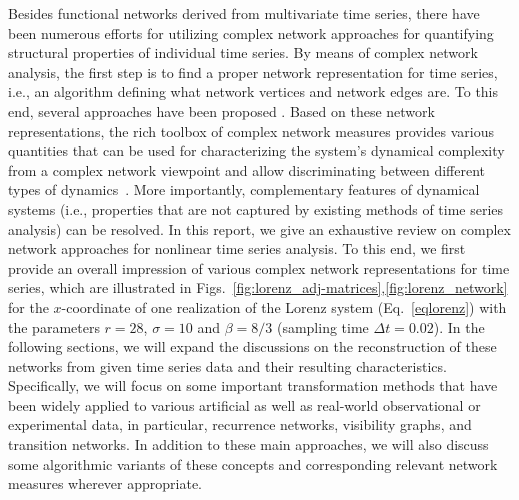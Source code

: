 	Besides functional networks derived from multivariate time series, there have been numerous efforts for utilizing complex network approaches for quantifying structural properties of individual time series. By means of complex network analysis, the first step is to find a proper network representation for time series, i.e., an algorithm defining what network vertices and network edges are. To this end, several approaches have been proposed \cite{Zhang2006,Xu2008,Lacasa2008,Marwan2009,Donner2010a,Donner2011,McCullough2015}. Based on these network representations, the rich toolbox of complex network measures \cite{Boccaletti2006,Costa2007,Newman2003} provides various quantities that can be used for characterizing the system's dynamical complexity from a complex network viewpoint and allow discriminating between different types of dynamics~\cite{Donner2011}. More importantly, complementary features of dynamical systems (i.e., properties that are not captured by existing methods of time series analysis) can be resolved. In this report, we give an exhaustive review on complex network approaches for nonlinear time series analysis. To this end, we first provide an overall impression of various complex network representations for time series, which are illustrated in Figs.~\ref{fig:lorenz_adj-matrices},\ref{fig:lorenz_network} for the $x$-coordinate of one realization of the Lorenz system (Eq.~\eqref{eqlorenz}) with the parameters $r=28$, $\sigma=10$ and $\beta=8/3$ (sampling time $\Delta t=0.02$). In the following sections, we will expand the discussions on the reconstruction of these networks from given time series data and their resulting characteristics. Specifically, we will focus on some important transformation methods that have been widely applied to various artificial as well as real-world observational or experimental data, in particular, recurrence networks, visibility graphs, and transition networks. In addition to these main approaches, we will also discuss some algorithmic variants of these concepts and corresponding relevant network measures wherever appropriate. 
